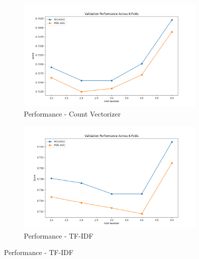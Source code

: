 \begin{figure}[H]
    \centering
    \begin{subfigure}[b]{0.48\textwidth}
        \includegraphics[width=\textwidth]{img/report_info/img/1.3.XGB/best_xgboost_count.png}
        \caption{Performance - Count Vectorizer}
        \label{fig:lr-count}
    \end{subfigure}
    \begin{subfigure}[b]{0.48\textwidth}
        \includegraphics[width=\textwidth]{img/report_info/img/1.3.XGB/best_xgboost_tfidf.png}
        \caption{Performance - TF-IDF}
        \label{fig:lr-tfidf}
    \end{subfigure}
    

\end{figure}
